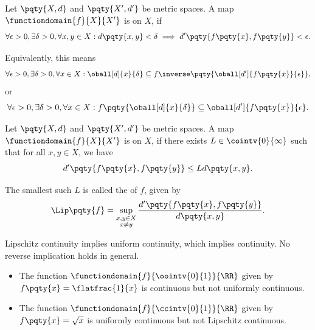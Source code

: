 \begin{definition}
    \label{def:uniform-continuity}%
    Let \(\pqty{X, d}\) and \(\pqty{X', d'}\) be metric spaces. A map \(\functiondomain{f}{X}{X'}\) is  on \(X\), if
    \[
        \forall \epsilon > 0, \exists \delta > 0, \forall x, y \in X: d\pqty{x, y} < \delta \implies d'\pqty{f\pqty{x}, f\pqty{y}} < \epsilon.
    \]

    Equivalently, this means
    \[
        \forall \epsilon > 0, \exists \delta > 0, \forall x \in X: \oball[d]{x}{\delta} \subseteq f\inverse\pqty{\oball[d']{f\pqty{x}}{\epsilon}},
    \]
    or
    \[
        \forall \epsilon > 0, \exists \delta > 0, \forall x \in X: f\pqty{\oball[d]{x}{\delta}} \subseteq \oball[d']{f\pqty{x}}{\epsilon}.
    \]
\end{definition}

\begin{definition}
    \label{def:lipschitz-continuity}%
    Let \(\pqty{X, d}\) and \(\pqty{X', d'}\) be metric spaces. A map \(\functiondomain{f}{X}{X'}\) is  on \(X\), if there exists \(L \in \cointv{0}{\infty}\) such that for all \(x, y \in X\), we have
    \[
        d'\pqty{f\pqty{x}, f\pqty{y}} \leq L d\pqty{x, y}.
    \]
    
    The smallest such \(L\) is called the  of \(f\), given by
    \[
        \Lip\pqty{f} = \sup_{\substack{x, y \in X \\ x \neq y}} \frac{d'\pqty{f\pqty{x}, f\pqty{y}}}{d\pqty{x, y}}.
    \]
\end{definition}

\begin{remark}
    Lipschitz continuity implies uniform continuity, which implies continuity. No reverse implication holds in general.
\end{remark}

\begin{examples}
    \begin{itemize}
        \item The function \(\functiondomain{f}{\oointv{0}{1}}{\RR}\) given by \(f\pqty{x} = \flatfrac{1}{x}\) is continuous but not uniformly continuous.
        \item The function \(\functiondomain{f}{\ccintv{0}{1}}{\RR}\) given by \(f\pqty{x} = \sqrt{x}\) is uniformly continuous but not Lipschitz continuous.
    \end{itemize}
\end{examples}

